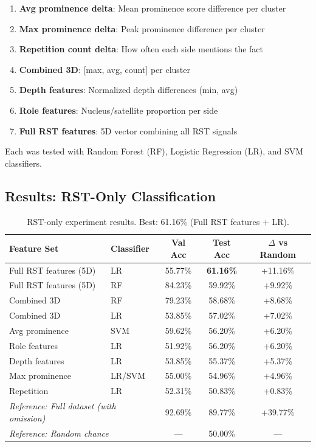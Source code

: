 \documentclass[12pt,a4paper]{article}
\begin{document}
\begin{enumerate}
\item \textbf{Avg prominence delta}: Mean prominence score difference per cluster
\item \textbf{Max prominence delta}: Peak prominence difference per cluster
\item \textbf{Repetition count delta}: How often each side mentions the fact
\item \textbf{Combined 3D}: [max, avg, count] per cluster
\item \textbf{Depth features}: Normalized depth differences (min, avg)
\item \textbf{Role features}: Nucleus/satellite proportion per side
\item \textbf{Full RST features}: 5D vector combining all RST signals
\end{enumerate}

Each was tested with Random Forest (RF), Logistic Regression (LR), and SVM classifiers.

\subsection{Results: RST-Only Classification}

\begin{table}[h]
\centering
\small
\begin{tabular}{llccc}
\hline
\textbf{Feature Set} & \textbf{Classifier} & \textbf{Val Acc} & \textbf{Test Acc} & \textbf{$\Delta$ vs Random} \\
\hline
Full RST features (5D) & LR & 55.77\% & \textbf{61.16\%} & +11.16\% \\
Full RST features (5D) & RF & 84.23\% & 59.92\% & +9.92\% \\
Combined 3D & RF & 79.23\% & 58.68\% & +8.68\% \\
Combined 3D & LR & 53.85\% & 57.02\% & +7.02\% \\
Avg prominence & SVM & 59.62\% & 56.20\% & +6.20\% \\
Role features & LR & 51.92\% & 56.20\% & +6.20\% \\
Depth features & LR & 53.85\% & 55.37\% & +5.37\% \\
Max prominence & LR/SVM & 55.00\% & 54.96\% & +4.96\% \\
Repetition & LR & 52.31\% & 50.83\% & +0.83\% \\
\hline
\multicolumn{2}{l}{\textit{Reference: Full dataset (with omission)}} & 92.69\% & 89.77\% & +39.77\% \\
\multicolumn{2}{l}{\textit{Reference: Random chance}} & --- & 50.00\% & --- \\
\hline
\end{tabular}
\caption{RST-only experiment results. Best: 61.16\% (Full RST features + LR).}
\label{tab:rst_only_results}
\end{table}
\end{document}

